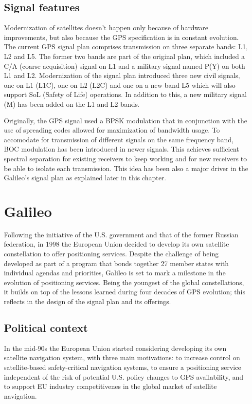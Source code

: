 \subsection{Signal features}
Modernization of satellites doesn't happen only because of hardware
improvements, but also because the GPS specification is in constant evolution.
The current GPS signal plan comprises transmission on three separate bands: L1,
L2 and L5. The former two bands are part of the original plan, which included a
C/A (coarse acquisition) signal on L1 and a military signal named P(Y) on both
L1 and L2. Modernization of the signal plan introduced three new civil signals,
one on L1 (L1C), one on L2 (L2C) and one on a new band L5 which will also
support SoL (Safety of Life) operations. In addition to this, a new military
signal (M) has been added on the L1 and L2 bands.

Originally, the GPS signal used a BPSK modulation that in conjunction with the
use of spreading codes allowed for maximization of bandwidth usage. To accomodate
for transmission of different signals on the same frequency band, BOC modulation
has been introduced in newer signals. This achieves sufficient spectral
separation for existing receivers to keep working and for new receivers to be
able to isolate each transmission. This idea has been also a major driver in the
Galileo's signal plan as explained later in this chapter.

\section{Galileo}
Following the initiative of the U.S. government and that of the former Russian
federation, in 1998 the European Union decided to develop its own satellite
constellation to offer positioning services. Despite the challenge of being
developed as part of a program that bonds together 27 member states with
individual agendas and priorities, Galileo is set to mark a milestone in the
evolution of positioning services. Being the youngest of the global
constellations, it builds on top of the lessons learned during four decades of
GPS evolution; this reflects in the design of the signal plan and its offerings.

\subsection{Political context}
In the mid-90s the European Union started considering developing its own
satellite navigation system, with three main motivations: to increase control on
satellite-based safety-critical navigation systems, to ensure a positioning
service independent of the risk of potential U.S. policy changes to GPS
availability, and to support EU industry competitivenes in the global market of
satellite navigation.

